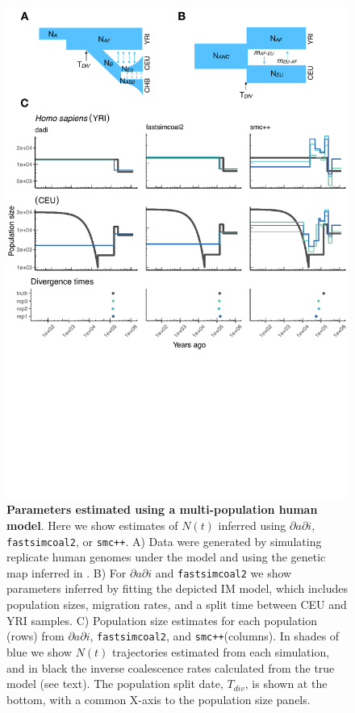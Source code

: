 \documentclass[12pt,halfline,a4paper]{ouparticle}
\newcommand{\dadi}{$\partial a \partial i$\xspace}
\newcommand{\smcpp}{\texttt{smc++}\xspace}
\newcommand{\fastsimcoal}{\texttt{fastsimcoal2}\xspace}
\begin{document}
\begin{figure}
\begin{center}
\includegraphics[width=0.7\linewidth]{display_items/homo_sapiens_two_popn_comp.pdf}
\caption{\textbf{Parameters estimated using a multi-population human model}.
Here we show estimates of $N(t)$ inferred using \dadi, \fastsimcoal, or \smcpp.
A) Data were generated by simulating
replicate human genomes under the \cite{gutenkunst2009inferring} model and using the genetic map
inferred in \cite{international2007second}.
B) For \dadi and \fastsimcoal we show parameters inferred
by fitting the depicted IM model, which includes population sizes, migration rates, and a split
time between CEU and YRI samples.
C) Population size estimates for each population (rows)
from \dadi, \fastsimcoal, and \smcpp (columns).
In shades of blue we show $N(t)$ trajectories estimated from each simulation,
and in black the inverse coalescence rates calculated from the true model (see text).
The population split date, $T_{div}$, is shown at
the bottom, with a common X-axis to the population size panels.}
\label{fig:IM_popn_human}
\end{center}
\end{figure}
\end{document}
